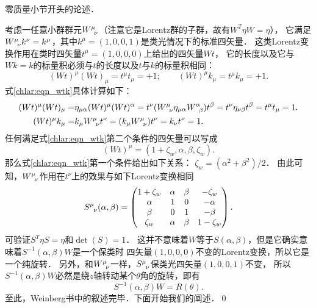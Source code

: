 \begin{example}\label{chlar:exam_weinberg-zero}
	\textcite[\S 2.5]{weinberg_vol1}零质量小节开头的论述．
\end{example}
考虑一任意小群群元$W^\mu_{\hphantom{\mu}\nu}$（注意它是Lorentz群的子群，故有$W^T \eta W = \eta$），
它满足$W^\mu_{\hphantom{\mu}\nu} k^\nu=k^\mu$，其中$k^\mu=(1,0,0,1)$是类光情况下的标准四矢量．
这类Lorentz变换作用在类时四矢量$t^\mu=(1,0,0,0)$上给出的四矢量$Wt$，
它的长度以及它与$W k=k$的标量积必须与$t$的长度以及$t$与$k$的标量积相同：
\begin{equation}\label{chlar:eqn_wtk}
	(W t)^\mu(W t)_\mu=t^\mu t_\mu=+1; \qquad
	(W t)^\mu k_\mu=t^\mu k_\mu=+1 .
\end{equation}
式\eqref{chlar:eqn_wtk}具体计算如下：
\begin{align*}
	(W t)^\mu(W t)_\mu=& \eta_{\mu\alpha} (W t)^\mu (W t)^\alpha
	= t^\nu( W^\mu_{\hphantom{\mu}\nu}  \eta_{\mu\alpha} W^\alpha_{\hphantom{\mu}\beta}) t^\beta
	= t^\nu \eta_{\nu\beta} t^\beta = t^\mu t_\mu=1. \\
	(W t)^\mu k_\mu=& k_\mu W^\mu_{\hphantom{\mu}\nu} t^\nu
	=(k_\mu W^\mu_{\hphantom{\mu}\nu}) t^\nu = k_\nu t^\nu = 1.
\end{align*}
任何满足式\eqref{chlar:eqn_wtk}第二个条件的四矢量可以写成
\begin{equation*}
	(W t)^\mu=(1+\zeta_w, \alpha, \beta, \zeta_w ) .
\end{equation*}
那么式\eqref{chlar:eqn_wtk}第一个条件给出如下关系：
$	\zeta_w=\left(\alpha^2+\beta^2\right) / 2 $．
由此可知，$W^\mu_{\hphantom{\mu}\nu}$作用在$t^\nu$上的效果与如下Lorentz变换相同
\begin{align*}
	S^\mu_{\hphantom{\mu}\nu}(\alpha, \beta)=
	\begin{pmatrix}
		{1 + \zeta_w } &\alpha&\beta&{ - \zeta_w } \\
		{\alpha }&1&0&{ - \alpha } \\
		{\beta }& 0&1&{ - \beta } \\
		{\zeta_w }& \alpha&\beta&{1 - \zeta_w }
	\end{pmatrix} .
\end{align*}
可验证$S^T \eta S = \eta $和$\det(S)=1$．
这并不意味着$W$等于$S(\alpha, \beta)$，但是它确实意味着$S^{-1}(\alpha, \beta)W$是一个保类时
四矢量$(1,0,0,0)$不变的Lorentz变换，所以它是一个纯旋转．
另外，和$W^\mu_{\hphantom{\mu}\nu}$一样，$S^\mu_{\hphantom{\mu}\nu}$保类光四矢量$(1,0,0,1)$不变，
所以$S^{-1}(\alpha, \beta)W$必然是绕$z$轴转动某个$\theta$角的旋转，即有
\begin{equation}\label{chlar:eqn_SWR}
	S^{-1}(\alpha, \beta) W=R(\theta).
\end{equation}
至此，Weinberg书中的叙述完毕．下面开始我们的阐述．\qed




